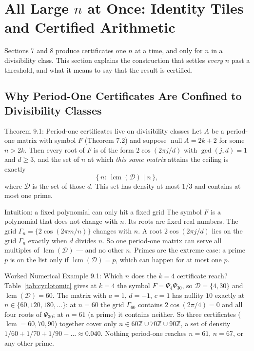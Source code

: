 \documentclass[11pt]{article}
\begin{document}
\section{All Large $n$ at Once: Identity Tiles and Certified Arithmetic}

Sections 7 and 8 produce certificates one $n$ at a time, and only for $n$ in a divisibility class. This section explains the construction that settles \emph{every} $n$ past a threshold, and what it means to say that the result is certified.

\subsection{Why Period-One Certificates Are Confined to Divisibility Classes}

\begin{thmbox}{Theorem 9.1: Period-one certificates live on divisibility classes}
Let $A$ be a period-one matrix with symbol $F$ (Theorem 7.2) and suppose $\operatorname{null}A=2k+2$ for some $n>2k$. Then every root of $F$ is of the form $2\cos(2\pi j/d)$ with $\gcd(j,d)=1$ and $d\ge3$, and the set of $n$ at which \emph{this same matrix} attains the ceiling is exactly
\begin{equation}
  \{\,n:\ \operatorname{lcm}(\mathcal D)\mid n\,\},
\end{equation}
where $\mathcal D$ is the set of those $d$. This set has density at most $1/3$ and contains at most one prime.
\end{thmbox}

\begin{intubox}{Intuition: a fixed polynomial can only hit a fixed grid}
The symbol $F$ is a polynomial that does not change with $n$. Its roots are fixed real numbers. The grid $\Gamma_n=\{2\cos(2\pi m/n)\}$ changes with $n$. A root $2\cos(2\pi j/d)$ lies on the grid $\Gamma_n$ exactly when $d$ divides $n$. So one period-one matrix can serve all multiples of $\operatorname{lcm}(\mathcal D)$ --- and no other $n$. Primes are the extreme case: a prime $p$ is on the list only if $\operatorname{lcm}(\mathcal D)=p$, which can happen for at most one $p$.
\end{intubox}

\begin{callbox}{Worked Numerical Example 9.1: Which $n$ does the $k=4$ certificate reach?}
Table~\ref{tab:cyclotomic} gives at $k=4$ the symbol $F=\Psi_4\Psi_{30}$, so $\mathcal D=\{4,30\}$ and $\operatorname{lcm}(\mathcal D)=60$. The matrix with $a=1$, $d=-1$, $c=1$ has nullity $10$ exactly at $n\in\{60,120,180,\dots\}$: at $n=60$ the grid $\Gamma_{60}$ contains $2\cos(2\pi/4)=0$ and all four roots of $\Psi_{30}$; at $n=61$ (a prime) it contains neither. So three certificates ($\operatorname{lcm}=60,70,90$) together cover only $n\in60\mathbb Z\cup70\mathbb Z\cup90\mathbb Z$, a set of density $1/60+1/70+1/90-\dots\approx0.040$. Nothing period-one reaches $n=61$, $n=67$, or any other prime.
\end{callbox}
\end{document}
